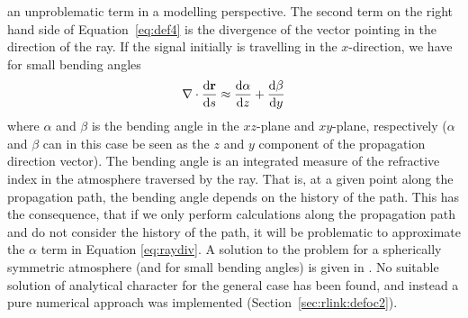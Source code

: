an unproblematic term in a modelling perspective.
The second term on the right hand side of Equation~\ref{eq:def4}
is the divergence of the vector pointing in the direction 
of the ray.  If the signal initially is travelling in the \(x\)-direction,
we have for small bending angles \citep{haugstad:78:turbu}
\begin{equation}
\label{eq:raydiv}
\nabla \cdot \frac{\mathrm{d} \bf{\ensuremath{r}}}{\mathrm{d} s}\approx
\frac{\mathrm{d} \alpha}{\mathrm{d} z}+\frac{\mathrm{d} \beta}{\mathrm{d} y}
\end{equation}
where \(\alpha\) and \(\beta\) is the bending angle in the \(xz\)-plane and
\(xy\)-plane, respectively (\(\alpha\) and \(\beta\) can in this case be seen
as the \(z\) and \(y\) component of the propagation direction vector). The
bending angle is an integrated measure of the refractive index in the
atmosphere traversed by the ray. That is, at a given point along the
propagation path, the bending angle depends on the history of the path. This
has the consequence, that if we only perform calculations along the propagation
path and do not consider the history of the path, it will be problematic to
approximate the \(\alpha\) term in Equation \ref{eq:raydiv}. A solution to the
problem for a spherically symmetric atmosphere (and for small bending angles)
is given in \citet{haugstad:78:turbu}. No suitable solution of analytical
character for the general case has been found, and instead a pure numerical
approach was implemented (Section~\ref{sec:rlink:defoc2}).

